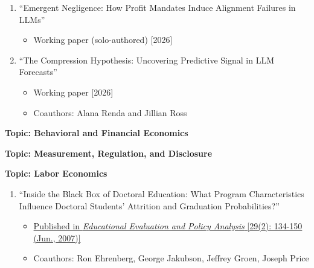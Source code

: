 \documentclass[11pt]{article}
\begin{document}
\begin{enumerate}
\item ``Emergent Negligence: How Profit Mandates Induce Alignment Failures in LLMs''
\begin{itemize}
\vspace*{-.07in}
	\item Working paper (solo-authored) [2026]
\end{itemize}
\vskip 0.24cm

\item ``The Compression Hypothesis: Uncovering Predictive Signal in LLM Forecasts''
\begin{itemize}
\vspace*{-.07in}
	\item Working paper [2026]
\vspace*{-.07in}
	\item Coauthors: Alana Renda and Jillian Ross
\end{itemize}

\end{enumerate}

\medskip
\vspace*{.2in}
{\bf Topic: Behavioral and Financial Economics} \\
\vspace*{-.2in}
\begin{enumerate}
    
\end{enumerate}

\medskip
\vspace*{.2in}
{\bf Topic: Measurement, Regulation, and Disclosure} \\
\vspace*{-.2in}
\begin{enumerate}
     
\end{enumerate}

\medskip
\vspace*{.1in}
{\bf Topic: Labor Economics} \\
\vspace*{-.2in}
\begin{enumerate}
\item``Inside the Black Box of Doctoral Education: What Program Characteristics Influence Doctoral Students' Attrition and Graduation Probabilities?''
\begin{itemize}
\vspace*{-.07in}
	\item \href{https://www.jstor.org/stable/30128037?seq=1#page_scan_tab_contents}{Published in {\it Educational Evaluation and Policy Analysis} [29(2): 134-150 (Jun., 2007)]}
\vspace*{-.07in}
	\item Coauthors: Ron Ehrenberg, George Jakubson, Jeffrey Groen, Joseph Price
\end{itemize}
\end{enumerate}
\end{document}
